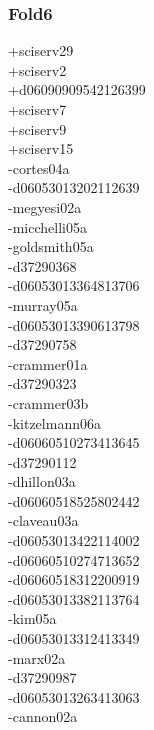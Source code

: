 \begin{multicols}{4}
\subsubsection*{Fold6}
+sciserv29\\
+sciserv2\\
+d06090909542126399\\
+sciserv7\\
+sciserv9\\
+sciserv15\\
-cortes04a\\
-d06053013202112639\\
-megyesi02a\\
-micchelli05a\\
-goldsmith05a\\
-d37290368\\
-d06053013364813706\\
-murray05a\\
-d06053013390613798\\
-d37290758\\
-crammer01a\\
-d37290323\\
-crammer03b\\
-kitzelmann06a\\
-d06060510273413645\\
-d37290112\\
-dhillon03a\\
-d06060518525802442\\
-claveau03a\\
-d06053013422114002\\
-d06060510274713652\\
-d06060518312200919\\
-d06053013382113764\\
-kim05a\\
-d06053013312413349\\
-marx02a\\
-d37290987\\
-d06053013263413063\\
-cannon02a\\

\end{multicols}
